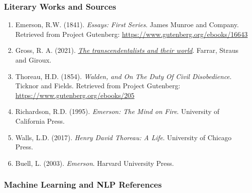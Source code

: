 \documentclass[
]{article}
\begin{document}
\subsubsection{Literary Works and
Sources}\label{literary-works-and-sources}

\begin{enumerate}
\def\labelenumi{\arabic{enumi}.}
\item
  Emerson, R.W. (1841). \emph{Essays: First Series}. James Munroe and
  Company. Retrieved from Project Gutenberg:
  \url{https://www.gutenberg.org/ebooks/16643}
\item
  Gross, R. A. (2021).
  \href{https://us.macmillan.com/books/9780374279325/thetranscendentalistsandtheirworld/}{\emph{The
  transcendentalists and their world}}. Farrar, Straus and Giroux.
\item
  Thoreau, H.D. (1854). \emph{Walden, and On The Duty Of Civil
  Disobedience}. Ticknor and Fields. Retrieved from Project Gutenberg:
  \url{https://www.gutenberg.org/ebooks/205}
\item
  Richardson, R.D. (1995). \emph{Emerson: The Mind on Fire}. University
  of California Press.
\item
  Walls, L.D. (2017). \emph{Henry David Thoreau: A Life}. University of
  Chicago Press.
\item
  Buell, L. (2003). \emph{Emerson}. Harvard University Press.
\end{enumerate}

\subsubsection{Machine Learning and NLP
References}\label{machine-learning-and-nlp-references}
\end{document}

